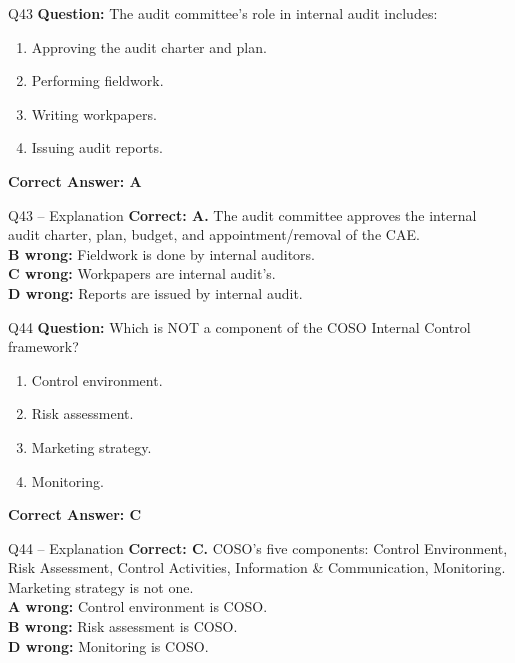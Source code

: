 \documentclass[aspectratio=169,10pt]{beamer}
\begin{document}
	\begin{frame}[t]{Q43}
		\small
		\textbf{Question:} The audit committee's role in internal audit includes:
		\begin{enumerate}[label=\Alph*.,itemsep=1pt,topsep=2pt]
			\item Approving the audit charter and plan.
			\item Performing fieldwork.
			\item Writing workpapers.
			\item Issuing audit reports.
		\end{enumerate}
		\vspace{4pt}
		\textbf{Correct Answer: A}
	\end{frame}
	
	\begin{frame}[t]{Q43 -- Explanation}
		\small
		\textbf{Correct: A.} The audit committee approves the internal audit charter, plan, budget, and appointment/removal of the CAE. \\[4pt]
		\textbf{B wrong:} Fieldwork is done by internal auditors. \\[2pt]
		\textbf{C wrong:} Workpapers are internal audit's. \\[2pt]
		\textbf{D wrong:} Reports are issued by internal audit.
	\end{frame}
	
	\begin{frame}[t]{Q44}
		\small
		\textbf{Question:} Which is NOT a component of the COSO Internal Control framework?
		\begin{enumerate}[label=\Alph*.,itemsep=1pt,topsep=2pt]
			\item Control environment.
			\item Risk assessment.
			\item Marketing strategy.
			\item Monitoring.
		\end{enumerate}
		\vspace{4pt}
		\textbf{Correct Answer: C}
	\end{frame}
	
	\begin{frame}[t]{Q44 -- Explanation}
		\small
		\textbf{Correct: C.} COSO's five components: Control Environment, Risk Assessment, Control Activities, Information \& Communication, Monitoring. Marketing strategy is not one. \\[4pt]
		\textbf{A wrong:} Control environment is COSO. \\[2pt]
		\textbf{B wrong:} Risk assessment is COSO. \\[2pt]
		\textbf{D wrong:} Monitoring is COSO.
	\end{frame}
	
\end{document}
